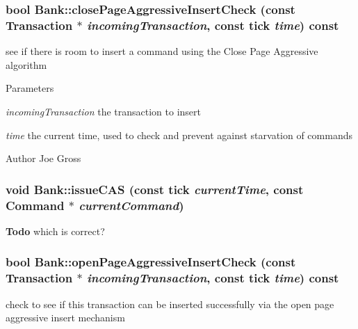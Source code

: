 \subsubsection[{closePageAggressiveInsertCheck}]{\setlength{\rightskip}{0pt plus 5cm}bool Bank::closePageAggressiveInsertCheck (const {\bf Transaction} $\ast$ {\em incomingTransaction}, \/  const tick {\em time}) const}\label{class_d_r_a_msim_i_i_1_1_bank_aa168722615032aaa2924257d78dc66a9}


see if there is room to insert a command using the Close Page Aggressive algorithm 


\begin{DoxyParams}{Parameters}
\item[{\em incomingTransaction}]the transaction to insert \item[{\em time}]the current time, used to check and prevent against starvation of commands \end{DoxyParams}
\begin{DoxyAuthor}{Author}
Joe Gross 
\end{DoxyAuthor}
\subsubsection[{issueCAS}]{\setlength{\rightskip}{0pt plus 5cm}void Bank::issueCAS (const tick {\em currentTime}, \/  const {\bf Command} $\ast$ {\em currentCommand})}\label{class_d_r_a_msim_i_i_1_1_bank_a1f759cc59082c2ca03271ca55f3ab1f6}


\begin{Desc}
\item[{\bf Todo}]which is correct? \end{Desc}


\subsubsection[{openPageAggressiveInsertCheck}]{\setlength{\rightskip}{0pt plus 5cm}bool Bank::openPageAggressiveInsertCheck (const {\bf Transaction} $\ast$ {\em incomingTransaction}, \/  const tick {\em time}) const}\label{class_d_r_a_msim_i_i_1_1_bank_aee120e04392028aace4dfa79c408e3d4}


check to see if this transaction can be inserted successfully via the open page aggressive insert mechanism 

